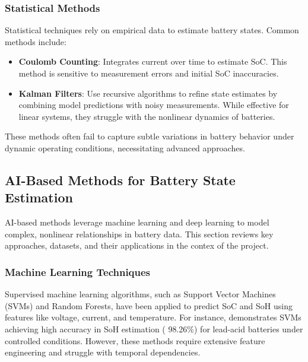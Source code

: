 \subsubsection{Statistical Methods}
Statistical techniques rely on empirical data to estimate battery states. Common methods include:
\begin{itemize}
    \item \textbf{Coulomb Counting}: Integrates current over time to estimate SoC. This method is sensitive to measurement errors and initial SoC inaccuracies.
    \item \textbf{Kalman Filters}: Use recursive algorithms to refine state estimates by combining model predictions with noisy measurements. While effective for linear systems, they struggle with the nonlinear dynamics of batteries.
\end{itemize}

These methods often fail to capture subtle variations in battery behavior under dynamic operating conditions, necessitating advanced approaches.

\subsection{AI-Based Methods for Battery State Estimation}
AI-based methods leverage machine learning and deep learning to model complex, nonlinear relationships in battery data. This section reviews key approaches, datasets, and their applications in the contex of the project.

\subsubsection{Machine Learning Techniques}
Supervised machine learning algorithms, such as Support Vector Machines (SVMs) and Random Forests, have been applied to predict SoC and SoH using features like voltage, current, and temperature. For instance, \cite{sun_simultaneous_2022} demonstrates SVMs achieving high accuracy in SoH estimation ( 98.26\%) for lead-acid batteries under controlled conditions. However, these methods require extensive feature engineering and struggle with temporal dependencies.

